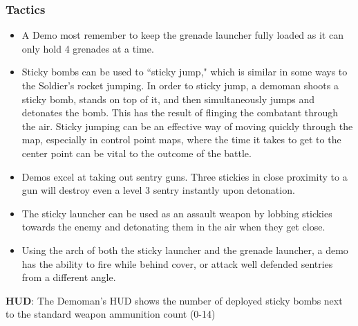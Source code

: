 \subsubsection {Tactics}
\begin {itemize}
\item A Demo most remember to keep the grenade launcher fully loaded as it can only hold 4 grenades at a time.

\item Sticky bombs can be used to “sticky jump," which is similar in some ways to the Soldier's rocket jumping.  In order to sticky jump, a demoman shoots a sticky bomb, stands on top of it, and then simultaneously jumps and detonates the bomb. This has the result of flinging the combatant through the air.  Sticky jumping can be an effective way of moving quickly through the map, especially in control point maps, where the time it takes to get to the center point can be vital to the outcome of the battle.

\item Demos excel at taking out sentry guns. Three stickies in close proximity to a gun will destroy even a level 3 sentry instantly upon detonation.

\item The sticky launcher can be used as an assault weapon by lobbing stickies towards the enemy and detonating them in the air when they get close.

\item Using the arch of both the sticky launcher and the grenade launcher, a demo has the ability to fire while behind cover, or attack well defended sentries from a different angle.

\end {itemize}
{\bf HUD}:
The Demoman's HUD shows the number of deployed sticky bombs next to the standard weapon ammunition count (0-14)